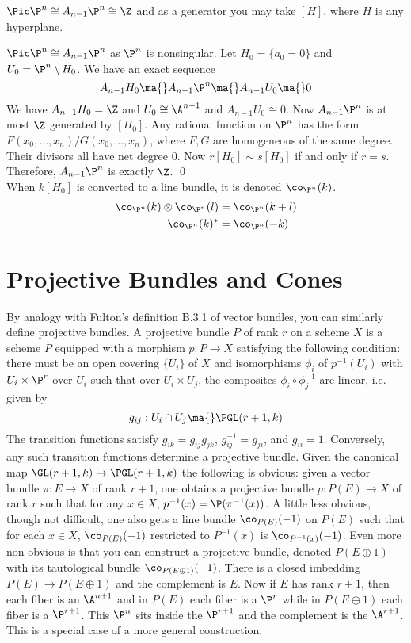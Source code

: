 \begin{prop}
$\Pic \P^n \cong A_{n-1} \P^n \cong \Z$ and as a generator you may take $[H]$, where $H$ is any hyperplane.
\end{prop}

\pf $\Pic \P^n \cong A_{n-1} \P^n$ as $\P^n$ is nonsingular. Let $H_0=\{a_0=0\}$ and $U_0=\P^n \setminus H_0$. We have an exact sequence
	\[
	A_{n-1}H_0 \ma{} A_{n-1} \P^n \ma{} A_{n-1} U_0 \ma{} 0
	\]
We have $A_{n-1}H_0=\Z$ and $U_0 \cong \A^{n-1}$ and $A_{n-1} U_0 \cong 0$. Now $A_{n-1} \P^n$ is at most $\Z$ generated by $[H_0]$. Any rational function on $\P^n$ has the form $F(x_0,\ldots,x_n)/G(x_0,\ldots,x_n)$, where $F,G$ are homogeneous of the same degree. Their divisors all have net degree 0. Now $r[H_0] \sim s[H_0]$ if and only if $r=s$. Therefore, $A_{n-1} \P^n$ is exactly $\Z$. \qed \\

When $k[H_0]$ is converted to a line bundle, it is denoted $\co_{\P^n}(k)$. 
	\[
	\begin{split}
	\co_{\P^n}(k) \otimes \co_{\P^n}(l) &= \co_{\P^n}(k+l) \\
	\co_{\P^n}(k)^*&= \co_{\P^n}(-k)
	\end{split}
	\]





\section{Projective Bundles and Cones}


By analogy with Fulton's definition B.3.1 of vector bundles, you can similarly define projective bundles. A projective bundle $P$ of rank $r$ on a scheme $X$ is a scheme $P$ equipped with a morphism $p: P \to X$ satisfying the following condition: there must be an open covering $\{U_i\}$ of $X$ and isomorphisms $\phi_i$ of $p^{-1}(U_i)$ with $U_i \times \P^r$ over $U_i$ such that over $U_i \times U_j$, the composites $\phi_i \circ \phi_j^{-1}$ are linear, i.e. given by
	\[
	g_{ij}: U_i \cap U_j \ma{} \PGL(r+1,k)
	\]
The transition functions satisfy $g_{ik}=g_{ij} g_{jk}$, $g_{ij}^{-1}=g_{ji}$, and $g_{ii}=1$. Conversely, any such transition functions determine a projective bundle. Given the canonical map $\GL(r+1,k) \to \PGL(r+1,k)$ the following is obvious: given a vector bundle $\pi: E \to X$ of rank $r+1$, one obtains a projective bundle $p: P(E) \to X$ of rank $r$ such that for any $x \in X$, $p^{-1}(x)=\P(\pi^{-1}(x))$. A little less obvious, though not difficult, one also gets a line bundle $\co_{P(E)}(-1)$ on $P(E)$ such that for each $x \in X$, $\co_{P(E)}(-1)$ restricted to $P^{-1}(x)$ is $\co_{P^{-1}(x)}(-1)$. Even more non-obvious is that you can construct a projective bundle, denoted $P(E \oplus 1)$ with its tautological bundle $\co_{P(E\oplus 1)}(-1)$. There is a closed imbedding $P(E) \to P(E\oplus 1)$ and the complement is $E$. Now if $E$ has rank $r+1$, then each fiber is an $\A^{n+1}$ and in $P(E)$ each fiber is a $\P^r$ while in $P(E \oplus 1)$ each fiber is a $\P^{r+1}$. This $\P^n$ sits inside the $\P^{r+1}$  and the complement is the $\A^{r+1}$. This is a special case of a more general construction.


